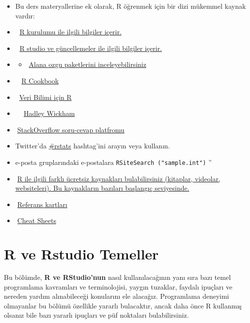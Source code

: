 \documentclass[
  oneside]{book}
\providecommand{\tightlist}{%
  \setlength{\itemsep}{0pt}\setlength{\parskip}{0pt}}
\begin{document}
\begin{itemize}
\item
  Bu ders materyallerine ek olarak, R öğrenmek için bir dizi mükemmel kaynak vardır:
\item
  🔗 \href{https://psyteachr.github.io/data-skills-v2/installing-r.html}{R kurulumu ile ilgili bilgiler içerir.}
\item
  🔗 \href{https://psyteachr.github.io/analysis-v2/updating-r-rstudio-and-packages.html}{R studio ve güncellemeler ile ilgili bilgiler içerir.}
\item
  \begin{itemize}
  \tightlist
  \item
    🔗\href{https://cran.r*\%20project.org/web/views/Psychometrics.html}{Alana ozgu paketlerini inceleyebilirsiniz}
  \end{itemize}
\item
  🔗 📖\href{http://www.cookbook-r.com/}{R Cookbook}
\item
  🔗📖\href{https://r4ds.had.co.nz/}{Veri Bilimi için R}
\item
  🔗 👨 \href{https://hadley.nz/}{Hadley Wickham}
\item
  🔗\href{https://stackoverflow.com/}{StackOverflow soru-cevap platfromu}
\item
  Twitter'da \href{https://twitter.com/search?f=tweets\&q=\%23rstats\&src=typd}{\#rstats} hashtag'ini arayın veya kullanın.
\item
  e-posta gruplarındaki e-postalara \texttt{RSiteSearch\ ("sample.int")} ''
\item
  🔗\href{https://www.learnr4free.com/tr/index.html}{R ile ilgili farklı ücretsiz kaynakları bulabilirsiniz (kitaplar, videolar, websiteleri). Bu kaynakların bazıları başlangıç seviyesinde.}
\item
  🔗\href{https://cran.r-project.org/doc/contrib/Short-refcard.pdf}{Referans kartları}
\item
  🔗\href{https://www.rstudio.com/resources/cheatsheets/}{Cheat Sheets}
\end{itemize}

\hypertarget{r-ve-rstudio-temeller}{%
\chapter{R ve Rstudio Temeller}\label{r-ve-rstudio-temeller}}

Bu bölümde, \textbf{R ve RStudio'nun} nasıl kullanılacağının yanı sıra bazı temel programlama kavramları ve terminolojisi, yaygın tuzaklar, faydalı ipuçları ve nereden yardım alınabileceği konularını ele alacağız. Programlama deneyimi olmayanlar bu bölümü özellikle yararlı bulacaktır, ancak daha önce R kullanmış olsanız bile bazı yararlı ipuçları ve püf noktaları bulabilirsiniz.
\end{document}
